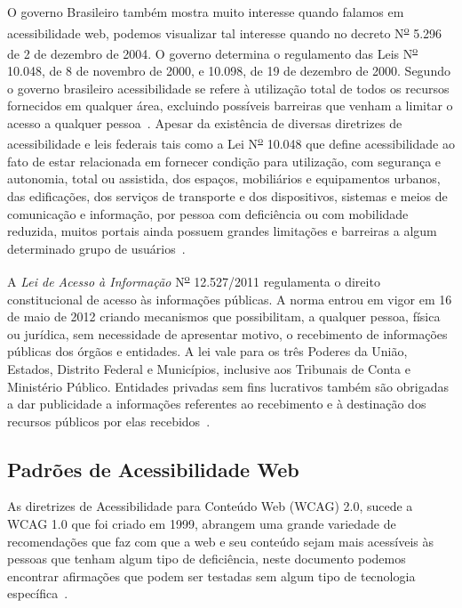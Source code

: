 O governo Brasileiro tamb\'em mostra muito interesse quando falamos em
acessibilidade web, podemos visualizar tal interesse quando no decreto N\textsuperscript{\underline{o}} 5.296
de 2 de dezembro de 2004. O governo determina o regulamento das Leis
N\textsuperscript{\underline{o}} 10.048, de 8 de novembro de 2000, e 10.098, de
19 de dezembro de 2000. Segundo o governo brasileiro acessibilidade se refere
\`a utiliza\c{c}\~ao total de todos os recursos fornecidos em qualquer \'area,
excluindo poss\'iveis barreiras que venham a limitar o acesso a qualquer
pessoa~\cite{AcessibilidadeBrasil}. Apesar da exist\^encia de diversas
diretrizes de acessibilidade e leis federais tais como a Lei
N\textsuperscript{\underline{o}} 10.048 que define acessibilidade ao fato de
estar relacionada em fornecer condi\c{c}\~ao para utiliza\c{c}\~ao, com seguran\c{c}a e
autonomia, total ou assistida, dos espa\c{c}os, mobili\'arios e equipamentos
urbanos, das edifica\c{c}\~oes, dos servi\c{c}os de transporte e dos dispositivos,
sistemas e meios de comunica\c{c}\~ao e informa\c{c}\~ao, por pessoa com defici\^encia ou
com mobilidade reduzida, muitos portais ainda possuem grandes limita\c{c}\~oes e
barreiras a algum determinado grupo de
usu\'arios~\cite{Freire,AcessibilidadeBrasil}.

A \emph{Lei de Acesso \`a Informa\c{c}\~ao} N\textsuperscript{\underline{o}} 12.527/2011 regulamenta o
direito constitucional de acesso \`as informa\c{c}\~oes p\'ublicas. A norma entrou em vigor em
16 de maio de 2012 criando mecanismos que possibilitam, a qualquer pessoa, 
f\'isica ou jur\'idica, sem necessidade de apresentar motivo, o recebimento de
informa\c{c}\~oes p\'ublicas dos \'org\~aos e entidades. A lei vale para os
tr\^es Poderes da Uni\~ao, Estados, Distrito Federal e Munic\'ipios, inclusive aos
Tribunais de Conta e Minist\'erio P\'ublico. Entidades privadas sem fins
lucrativos tamb\'em s\~ao obrigadas a dar publicidade a informa\c{c}\~oes referentes
ao recebimento e \`a destina\c{c}\~ao dos recursos p\'ublicos por elas
recebidos~\cite{LAI}.


\subsection{Padr\~oes de Acessibilidade Web}
\label{subsec:PadroesdeAcessibilidadeWeb}
 
As diretrizes de Acessibilidade para Conte\'udo Web (WCAG) 2.0, sucede a WCAG
1.0 que foi criado em 1999, abrangem uma grande variedade de recomenda\c{c}\~oes
que faz com que a web e seu conte\'udo sejam mais acess\'iveis \`as pessoas que
tenham algum tipo de defici\^encia, neste documento podemos encontrar afirma\c{c}\~oes que
podem ser testadas sem algum tipo de tecnologia espec\'ifica~\cite{Caldwell}. 


